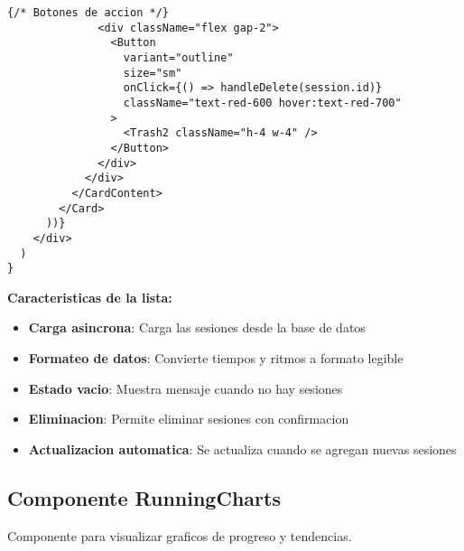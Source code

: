 \documentclass[12pt,a4paper]{article}
\begin{document}
\begin{lstlisting}[caption=components/running/running-list.tsx - Estructura principal]
              {/* Botones de accion */}
              <div className="flex gap-2">
                <Button
                  variant="outline"
                  size="sm"
                  onClick={() => handleDelete(session.id)}
                  className="text-red-600 hover:text-red-700"
                >
                  <Trash2 className="h-4 w-4" />
                </Button>
              </div>
            </div>
          </CardContent>
        </Card>
      ))}
    </div>
  )
}
\end{lstlisting}

\textbf{Caracteristicas de la lista:}
\begin{itemize}
    \item \textbf{Carga asincrona}: Carga las sesiones desde la base de datos
    \item \textbf{Formateo de datos}: Convierte tiempos y ritmos a formato legible
    \item \textbf{Estado vacio}: Muestra mensaje cuando no hay sesiones
    \item \textbf{Eliminacion}: Permite eliminar sesiones con confirmacion
    \item \textbf{Actualizacion automatica}: Se actualiza cuando se agregan nuevas sesiones
\end{itemize}

\subsection{Componente RunningCharts}

Componente para visualizar graficos de progreso y tendencias.
\end{document}
